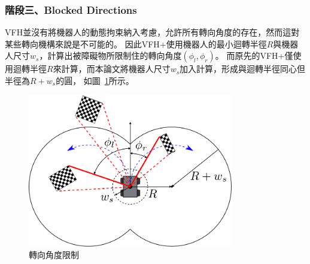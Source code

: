 \subsubsection{階段三、Blocked Directions}
VFH並沒有將機器人的動態拘束納入考慮，允許所有轉向角度的存在，然而這對某些轉向機構來說是不可能的。
因此VFH+使用機器人的最小迴轉半徑$R$與機器人尺寸$w_s$，計算出被障礙物所限制住的轉向角度$(\phi_l,\phi_r)$。
而原先的VFH+僅使用迴轉半徑$R$來計算，而本論文將機器人尺寸$w_s$加入計算，形成與迴轉半徑同心但半徑為$R+w_s$的圓，
如圖~\ref{f:block_directions}所示。
\begin{figure}
	\centering
	\includegraphics[width=0.8\textwidth]{figures/algorithm/blocked_directions}
	\caption{轉向角度限制}
	\label{f:block_directions}
\end{figure}

